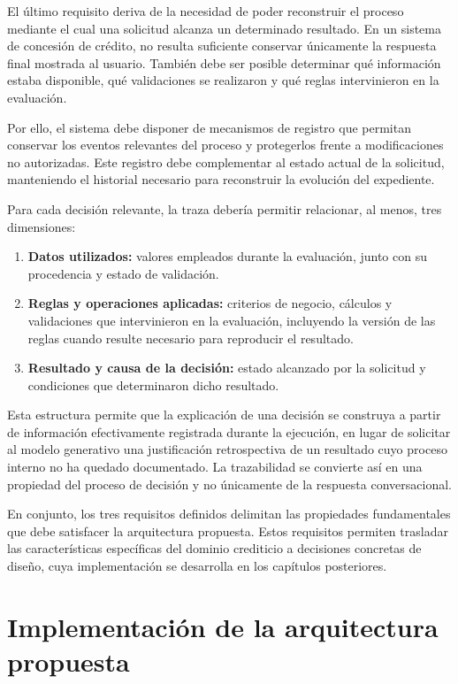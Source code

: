 \documentclass[12pt,a4paper]{report}
\begin{document}
El último requisito deriva de la necesidad de poder reconstruir el proceso mediante el cual una solicitud alcanza un determinado resultado. En un sistema de concesión de crédito, no resulta suficiente conservar únicamente la respuesta final mostrada al usuario. También debe ser posible determinar qué información estaba disponible, qué validaciones se realizaron y qué reglas intervinieron en la evaluación.

Por ello, el sistema debe disponer de mecanismos de registro que permitan conservar los eventos relevantes del proceso y protegerlos frente a modificaciones no autorizadas. Este registro debe complementar al estado actual de la solicitud, manteniendo el historial necesario para reconstruir la evolución del expediente.

Para cada decisión relevante, la traza debería permitir relacionar, al menos, tres dimensiones:

\begin{enumerate}
	\item \textbf{Datos utilizados:} valores empleados durante la evaluación, junto con su procedencia y estado de validación.
	\item \textbf{Reglas y operaciones aplicadas:} criterios de negocio, cálculos y validaciones que intervinieron en la evaluación, incluyendo la versión de las reglas cuando resulte necesario para reproducir el resultado.
	\item \textbf{Resultado y causa de la decisión:} estado alcanzado por la solicitud y condiciones que determinaron dicho resultado.
\end{enumerate}

Esta estructura permite que la explicación de una decisión se construya a partir de información efectivamente registrada durante la ejecución, en lugar de solicitar al modelo generativo una justificación retrospectiva de un resultado cuyo proceso interno no ha quedado documentado. La trazabilidad se convierte así en una propiedad del proceso de decisión y no únicamente de la respuesta conversacional.

En conjunto, los tres requisitos definidos delimitan las propiedades fundamentales que debe satisfacer la arquitectura propuesta. Estos requisitos permiten trasladar las características específicas del dominio crediticio a decisiones concretas de diseño, cuya implementación se desarrolla en los capítulos posteriores.

\chapter{Implementación de la arquitectura propuesta}
\sloppy
\end{document}
